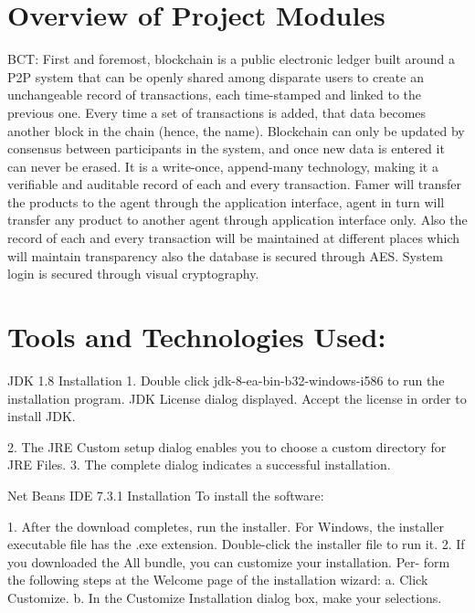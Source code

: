 \documentclass[oneside,a4paper,12pt]{report}
\begin{document}
{\section{Overview of Project Modules}
BCT: First and foremost, blockchain is a public electronic ledger built around a P2P system that can be openly shared among disparate users to create an unchangeable record of transactions, each time-stamped and linked to the previous one. Every time a set of transactions is added, that data becomes another block in the chain (hence, the name). Blockchain can only be updated by consensus between participants in the system, and once new data is entered it can never be erased. It is a write-once, append-many technology, making it a verifiable and auditable record of each and every transaction.
Famer will transfer the products to the agent through the application interface, agent in turn will transfer any product to another agent through application interface only. Also the record of each and every transaction will be maintained at different places which will maintain transparency also the database is secured through AES. System login is secured through visual cryptography.

\newpage
\section{Tools and Technologies Used:}
JDK 1.8 Installation
1.	Double click jdk-8-ea-bin-b32-windows-i586 to run the installation program.
JDK License dialog displayed. Accept the license in order to install JDK.

2.	The JRE Custom setup dialog enables you to choose a custom directory for JRE Files.
3.	The complete dialog indicates a successful installation.

Net Beans IDE 7.3.1 Installation
To install the software:

1.	After the download completes, run the installer. For Windows, the installer executable file has the .exe extension. Double-click the installer file to run it.
2.	If you downloaded the All bundle, you can customize your installation. Per- form the following steps at the Welcome page of the installation wizard:
a.	Click Customize.
b.	In the Customize Installation dialog box, make your selections.

}
\end{document}

